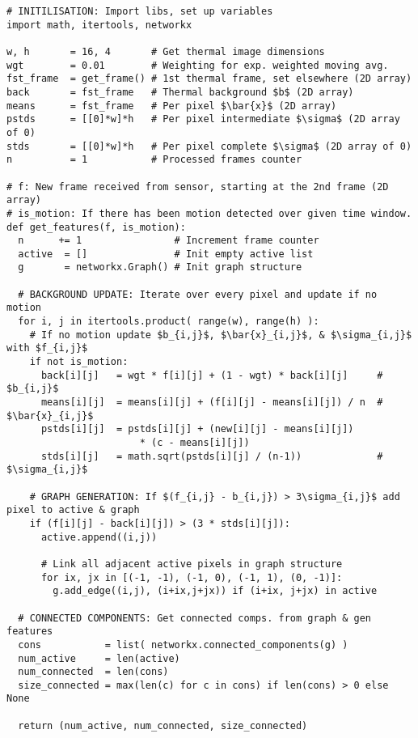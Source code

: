 \begin{verbatim}
# INITILISATION: Import libs, set up variables
import math, itertools, networkx

w, h       = 16, 4       # Get thermal image dimensions
wgt        = 0.01        # Weighting for exp. weighted moving avg.
fst_frame  = get_frame() # 1st thermal frame, set elsewhere (2D array)
back       = fst_frame   # Thermal background $b$ (2D array)
means      = fst_frame   # Per pixel $\bar{x}$ (2D array)
pstds      = [[0]*w]*h   # Per pixel intermediate $\sigma$ (2D array of 0) 
stds       = [[0]*w]*h   # Per pixel complete $\sigma$ (2D array of 0)
n          = 1           # Processed frames counter

# f: New frame received from sensor, starting at the 2nd frame (2D array)
# is_motion: If there has been motion detected over given time window.
def get_features(f, is_motion):
  n      += 1                # Increment frame counter
  active  = []               # Init empty active list
  g       = networkx.Graph() # Init graph structure

  # BACKGROUND UPDATE: Iterate over every pixel and update if no motion
  for i, j in itertools.product( range(w), range(h) ):
    # If no motion update $b_{i,j}$, $\bar{x}_{i,j}$, & $\sigma_{i,j}$  with $f_{i,j}$  
    if not is_motion:
      back[i][j]   = wgt * f[i][j] + (1 - wgt) * back[i][j]     # $b_{i,j}$
      means[i][j]  = means[i][j] + (f[i][j] - means[i][j]) / n  # $\bar{x}_{i,j}$
      pstds[i][j]  = pstds[i][j] + (new[i][j] - means[i][j])
                       * (c - means[i][j])
      stds[i][j]   = math.sqrt(pstds[i][j] / (n-1))             # $\sigma_{i,j}$
        
    # GRAPH GENERATION: If $(f_{i,j} - b_{i,j}) > 3\sigma_{i,j}$ add pixel to active & graph
    if (f[i][j] - back[i][j]) > (3 * stds[i][j]):
      active.append((i,j))

      # Link all adjacent active pixels in graph structure
      for ix, jx in [(-1, -1), (-1, 0), (-1, 1), (0, -1)]:
        g.add_edge((i,j), (i+ix,j+jx)) if (i+ix, j+jx) in active

  # CONNECTED COMPONENTS: Get connected comps. from graph & gen features
  cons           = list( networkx.connected_components(g) )
  num_active     = len(active)
  num_connected  = len(cons)
  size_connected = max(len(c) for c in cons) if len(cons) > 0 else None

  return (num_active, num_connected, size_connected)
\end{verbatim}
